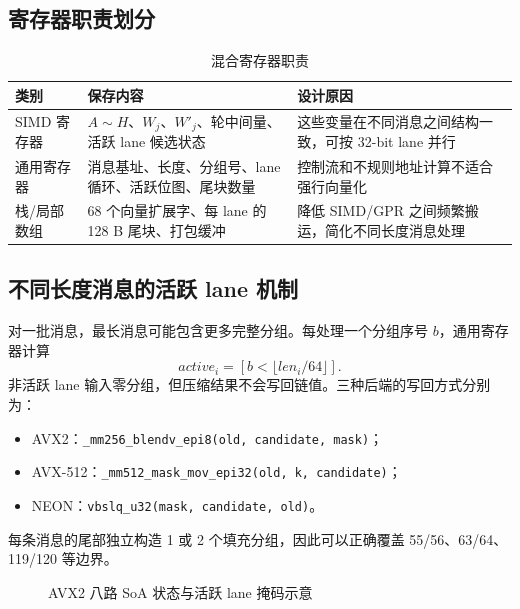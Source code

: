 \documentclass[UTF8,a4paper,12pt]{ctexart}
\newcommand{\code}[1]{\texttt{#1}}
\newcommand{\vect}[1]{\bm{#1}}
\begin{document}
\subsection{寄存器职责划分}
\begin{table}[H]
\centering
\caption{混合寄存器职责}
\begin{tabularx}{\textwidth}{p{3.2cm}X X}
\toprule
类别 & 保存内容 & 设计原因 \\
\midrule
SIMD 寄存器 & $A\sim H$、$W_j$、$W'_j$、轮中间量、活跃 lane 候选状态 & 这些变量在不同消息之间结构一致，可按 32-bit lane 并行 \\
通用寄存器 & 消息基址、长度、分组号、lane 循环、活跃位图、尾块数量 & 控制流和不规则地址计算不适合强行向量化 \\
栈/局部数组 & 68 个向量扩展字、每 lane 的 128 B 尾块、打包缓冲 & 降低 SIMD/GPR 之间频繁搬运，简化不同长度消息处理 \\
\bottomrule
\end{tabularx}
\end{table}

\subsection{不同长度消息的活跃 lane 机制}
对一批消息，最长消息可能包含更多完整分组。每处理一个分组序号 $b$，通用寄存器计算
\begin{equation}
active_i=[b < \lfloor len_i/64\rfloor].
\end{equation}
非活跃 lane 输入零分组，但压缩结果不会写回链值。三种后端的写回方式分别为：
\begin{itemize}
  \item AVX2：\code{\_mm256\_blendv\_epi8(old, candidate, mask)}；
  \item AVX-512：\code{\_mm512\_mask\_mov\_epi32(old, k, candidate)}；
  \item NEON：\code{vbslq\_u32(mask, candidate, old)}。
\end{itemize}
每条消息的尾部独立构造 1 或 2 个填充分组，因此可以正确覆盖 55/56、63/64、119/120 等边界。

\begin{figure}[H]
\centering
{}
\caption{AVX2 八路 SoA 状态与活跃 lane 掩码示意}
\end{figure}
\end{document}
